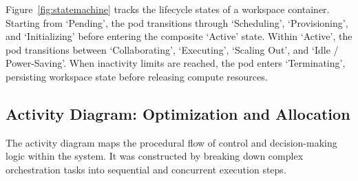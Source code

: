 \documentclass[12pt,a4paper]{report}
\begin{document}
	Figure~\ref{fig:statemachine} tracks the lifecycle states of a workspace container. Starting from `Pending', the pod transitions through `Scheduling', `Provisioning', and `Initializing' before entering the composite `Active' state. Within `Active', the pod transitions between `Collaborating', `Executing', `Scaling Out', and `Idle / Power-Saving'. When inactivity limits are reached, the pod enters `Terminating', persisting workspace state before releasing compute resources.
	
	\clearpage
	\subsection{Activity Diagram: Optimization and Allocation}
	
	The activity diagram maps the procedural flow of control and decision-making logic within the system. It was constructed by breaking down complex orchestration tasks into sequential and concurrent execution steps.
	
\end{document}
